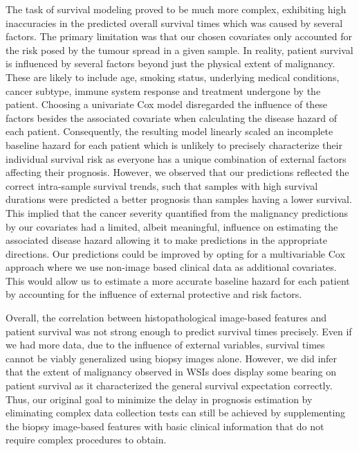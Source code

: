 \documentclass{l4proj}
\begin{document}
The task of survival modeling proved to be much more complex, exhibiting high inaccuracies in the predicted overall survival times which was caused by several factors. The primary limitation was that our chosen covariates only accounted for the risk posed by the tumour spread in a given sample. In reality, patient survival is influenced by several factors beyond just the physical extent of malignancy. These are likely to include age, smoking status, underlying medical conditions, cancer subtype, immune system response and treatment undergone by the patient. Choosing a univariate Cox model disregarded the influence of these factors besides the associated covariate when calculating the disease hazard of each patient. Consequently, the resulting model linearly scaled an incomplete baseline hazard for each patient which is unlikely to precisely characterize their individual survival risk as everyone has a unique combination of external factors affecting their prognosis. However, we observed that our predictions reflected the correct intra-sample survival trends, such that samples with high survival durations were predicted a better prognosis than samples having a lower survival. This implied that the cancer severity quantified from the malignancy predictions by our covariates had a limited, albeit meaningful, influence on estimating the associated disease hazard allowing it to make predictions in the appropriate directions. Our predictions could be improved by opting for a multivariable Cox approach where we use non-image based clinical data as additional covariates. This would allow us to estimate a more accurate baseline hazard for each patient by accounting for the influence of external protective and risk factors. 

Overall, the correlation between histopathological image-based features and patient survival was not strong enough to predict survival times precisely. Even if we had more data, due to the influence of external variables, survival times cannot be viably generalized using biopsy images alone. However, we did infer that the extent of malignancy observed in WSIs does display some bearing on patient survival as it characterized the general survival expectation correctly. Thus, our original goal to minimize the delay in prognosis estimation by eliminating complex data collection tests can still be achieved by supplementing the biopsy image-based features with basic clinical information that do not require complex procedures to obtain. 
\end{document}
